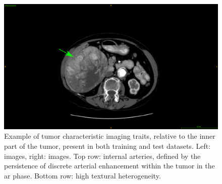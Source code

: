 \begin{figure}[!ht]
\begin{minipage}{0.45\linewidth}
	\end{minipage} \hspace{-0.1cm}
	\begin{minipage}{0.45\linewidth}
		\includegraphics[width=\linewidth]{../Contributions/images/ImagingTraits/ResizeTCIA_texturalHeterogeneity}
	\end{minipage}
	\caption{Example of tumor characteristic imaging traits, relative to the inner part of the tumor, present in both training and test datasets. Left: \textbf{} images, right: \textbf{} images. Top row: internal arteries, defined by the persistence of discrete arterial enhancement within the tumor in the \ac{ar} phase. Bottom row: high textural heterogeneity.}
	\label{fig:InterDb_imagingTraits2}
\end{figure}
